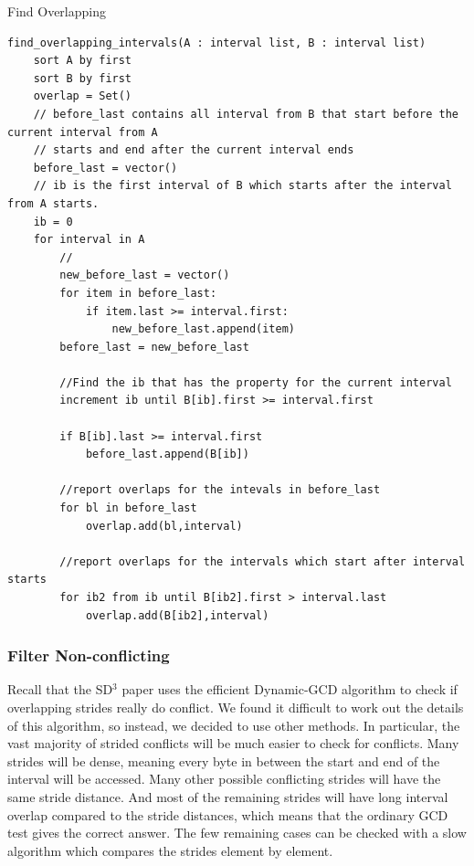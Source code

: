 \documentclass[12pt,twoside]{reedthesis}
\begin{document}
\begin{algorithm}
    \caption{Find Overlapping}
    \label{algo:findoverlapping}
\begin{verbatim}
find_overlapping_intervals(A : interval list, B : interval list)
    sort A by first
    sort B by first
    overlap = Set()
    // before_last contains all interval from B that start before the current interval from A
    // starts and end after the current interval ends
    before_last = vector() 
    // ib is the first interval of B which starts after the interval from A starts. 
    ib = 0
    for interval in A
        //
        new_before_last = vector()
        for item in before_last:
            if item.last >= interval.first:
                new_before_last.append(item)
        before_last = new_before_last
        
        //Find the ib that has the property for the current interval
        increment ib until B[ib].first >= interval.first
        
        if B[ib].last >= interval.first
            before_last.append(B[ib])

        //report overlaps for the intevals in before_last
        for bl in before_last
            overlap.add(bl,interval)

        //report overlaps for the intervals which start after interval starts
        for ib2 from ib until B[ib2].first > interval.last
            overlap.add(B[ib2],interval)
\end{verbatim}
\end{algorithm}
		
		
		\subsubsection{Filter Non-conflicting}
		
			Recall that the SD$^3$ paper uses the efficient Dynamic-GCD algorithm to check if overlapping strides really do conflict. We found it difficult to work out the details of this algorithm, so instead, we decided to use other methods. In particular, the vast majority of strided conflicts will be much easier to check for conflicts. Many strides will be dense, meaning every byte in between the start and end of the interval will be accessed. Many other possible conflicting strides will have the same stride distance. And most of the remaining strides will have long interval overlap compared to the stride distances, which means that the ordinary GCD test gives the correct answer.
			The few remaining cases can be checked with a slow algorithm which compares the strides element by element.
			 
\end{document}
